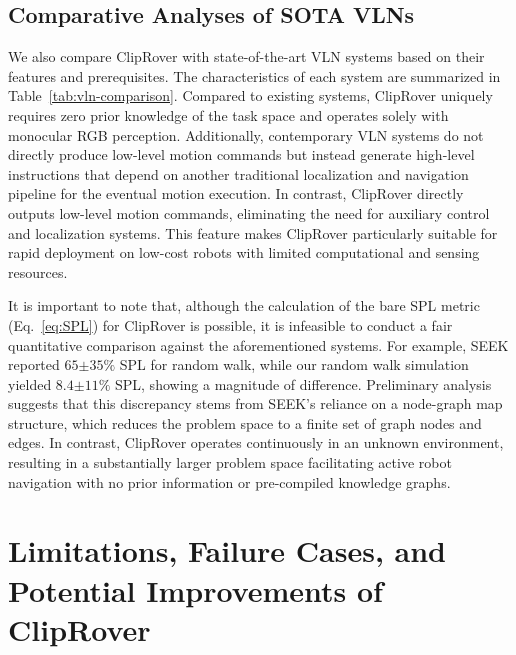 

\subsection{Comparative Analyses of SOTA VLNs}
We also compare ClipRover with state-of-the-art VLN systems based on their features and prerequisites. The characteristics of each system are summarized in Table~\ref{tab:vln-comparison}. Compared to existing systems, ClipRover uniquely requires zero prior knowledge of the task space and operates solely with monocular RGB perception. Additionally, contemporary VLN systems do not directly produce low-level motion commands but instead generate high-level instructions that depend on another traditional localization and navigation pipeline for the eventual motion execution. In contrast, ClipRover directly outputs low-level motion commands, eliminating the need for auxiliary control and localization systems. This feature makes ClipRover particularly suitable for rapid deployment on low-cost robots with limited computational and sensing resources.



It is important to note that, although the calculation of the bare SPL metric (Eq.~\ref{eq:SPL}) for ClipRover is possible, it is infeasible to conduct a fair quantitative comparison against the aforementioned systems. For example, SEEK \cite{Ginting2024Seek} reported $65${\small$\pm35$}$\%$ SPL for random walk, while our random walk simulation yielded $8.4${\small$\pm11$}$\%$ SPL, showing a magnitude of difference. Preliminary analysis suggests that this discrepancy stems from SEEK's reliance on a node-graph map structure, which reduces the problem space to a finite set of graph nodes and edges. In contrast, ClipRover operates continuously in an unknown environment, resulting in a substantially larger problem space facilitating active robot navigation with no prior information or pre-compiled knowledge graphs.


\vspace{1mm}
\section{Limitations, Failure Cases, and Potential Improvements of ClipRover}
